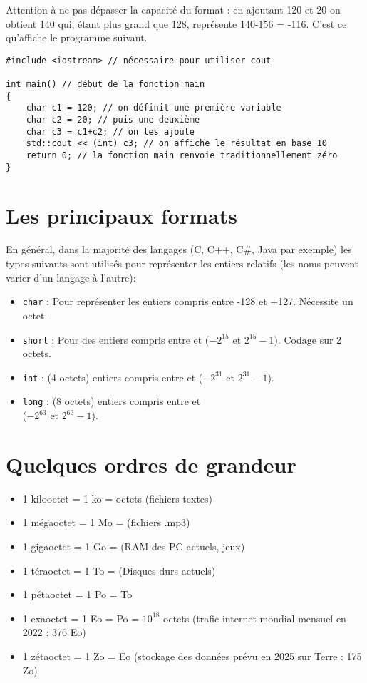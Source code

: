 Attention à ne pas dépasser la capacité du format : en ajoutant 120 et 20 on obtient 140 qui, étant plus grand que 128, représente 140-156 = -116. C'est ce qu'affiche le programme suivant.
\begin{verbatim}
#include <iostream> // nécessaire pour utiliser cout

int main() // début de la fonction main
{
    char c1 = 120; // on définit une première variable
    char c2 = 20; // puis une deuxième
    char c3 = c1+c2; // on les ajoute
    std::cout << (int) c3; // on affiche le résultat en base 10
    return 0; // la fonction main renvoie traditionnellement zéro
}
\end{verbatim}

\section{Les principaux formats}

En général, dans la majorité des langages (C, C++, C\#, Java par exemple)  les types suivants
sont utilisés pour représenter les entiers relatifs (les noms peuvent varier d'un langage à l'autre):
\begin{itemize}
    \item  \texttt{char} :  Pour représenter les entiers compris entre -128 et +127. Nécessite un octet.
    \item  \texttt{short} :  Pour des entiers compris entre  et  ($-2^{15}$ et $2^{15}-1$). Codage sur 2
          octets.
    \item  \texttt{int} :  (4 octets) entiers compris entre  et  ($-2^{31}$ et $2^{31}-1$).
    \item  \texttt{long} : (8 octets) entiers compris entre  et\\  ($-2^{63}$ et
          $2^{63}-1$).
\end{itemize}

\section{Quelques ordres de grandeur}
\begin{itemize}
    \item   1 kilooctet = 1 ko =   octets (fichiers textes)
    \item   1 mégaoctet = 1 Mo =  (fichiers .mp3)
    \item   1 gigaoctet = 1 Go =  (RAM des PC actuels, jeux)
    \item   1 téraoctet = 1 To =  (Disques durs actuels)
    \item   1 pétaoctet = 1 Po =  To
    \item   1 exaoctet = 1 Eo =  Po = $10^{18}$ octets (trafic internet mondial mensuel en 2022 : 376 Eo)
    \item   1 zétaoctet = 1 Zo =  Eo (stockage des données prévu en 2025 sur Terre : 175 Zo)
\end{itemize}

